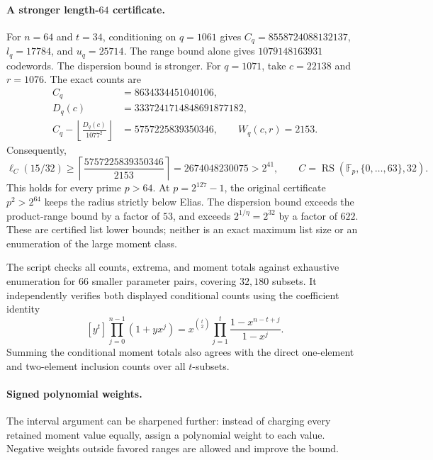\documentclass[11pt,letterpaper]{article}
\theoremstyle{definition}
\theoremstyle{remark}
\newcommand{\F}{\mathbb F}
\newcommand{\RS}{\operatorname{RS}}
\begin{document}
\paragraph{A stronger length-$64$ certificate.}
For $n=64$ and $t=34$, conditioning on $q=1061$ gives
$C_q=8558724088132137$, $l_q=17784$, and $u_q=25714$.
The range bound alone gives $1079148163931$ codewords.
The dispersion bound is stronger. For $q=1071$, take $c=22138$
and $r=1076$. The exact counts are
\[
 \begin{aligned}
 C_q&=8634334451040106,\\
 D_q(c)&=3337241714848691877182,\\
 C_q-\left\lfloor\frac{D_q(c)}{1077^2}\right\rfloor
   &=5757225839350346,\qquad W_q(c,r)=2153.
 \end{aligned}
\]
Consequently,
\begin{equation}\label{eq:conditional-n64}
 \ell_C(15/32)\ge
 \left\lceil\frac{5757225839350346}{2153}\right\rceil
 =2674048230075>2^{41},
 \qquad C=\RS(\F_p,\{0,\ldots,63\},32).
\end{equation}
This holds for every prime $p>64$. At $p=2^{127}-1$, the original
certificate $p^2>2^{64}$ keeps the radius strictly below Elias.
The dispersion bound exceeds the product-range bound by a
factor of $53$, and exceeds $2^{1/\eta}=2^{32}$ by a factor of $622$.
These are certified list lower bounds; neither is an exact maximum
list size or an enumeration of the large moment class.

The script  checks all
counts, extrema, and moment totals against exhaustive enumeration for
$66$ smaller parameter pairs, covering $32{,}180$ subsets.
It independently verifies both displayed conditional counts using
the coefficient identity
\[
 [y^t]\prod_{j=0}^{n-1}(1+yx^j)
 =x^{\binom t2}\prod_{j=1}^t\frac{1-x^{n-t+j}}{1-x^j}.
\]
Summing the conditional moment totals also agrees with the direct
one-element and two-element inclusion counts over all $t$-subsets.

\paragraph{Signed polynomial weights.}
The interval argument can be sharpened further: instead of charging every
retained moment value equally, assign a polynomial weight to each value.
Negative weights outside favored ranges are allowed and improve the bound.
\end{document}
